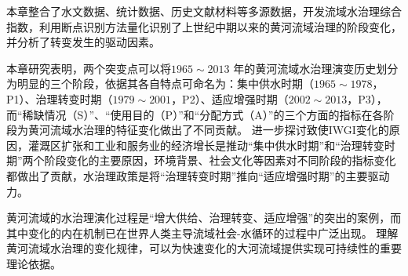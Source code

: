 本章整合了水文数据、统计数据、历史文献材料等多源数据，开发流域水治理综合指数，利用断点识别方法量化识别了上世纪中期以来的黄河流域治理的阶段变化，并分析了转变发生的驱动因素。

本章研究表明，两个突变点可以将$1965 \sim 2013$ 年的黄河流域水治理演变历史划分为明显的三个阶段，依据其各自特点可命名为：集中供水时期（$1965 \sim 1978$，P1）、治理转变时期（$1979 \sim 2001$，P2）、适应增强时期（$2002 \sim 2013$，P3），而“稀缺情况（S）”、“使用目的（P）”和“分配方式（A）”的三个方面的指标在各阶段为黄河流域水治理的特征变化做出了不同贡献。
进一步探讨致使IWGI变化的原因，灌溉区扩张和工业和服务业的经济增长是推动“集中供水时期”和“治理转变时期”两个阶段变化的主要原因，环境背景、社会文化等因素对不同阶段的指标变化都做出了贡献，水治理政策是将“治理转变时期”推向“适应增强时期”的主要驱动力。

黄河流域的水治理演化过程是“增大供给、治理转变、适应增强”的突出的案例，而其中变化的内在机制已在世界人类主导流域社会-水循环的过程中广泛出现。
理解黄河流域水治理的变化规律，可以为快速变化的大河流域提供实现可持续性的重要理论依据。
